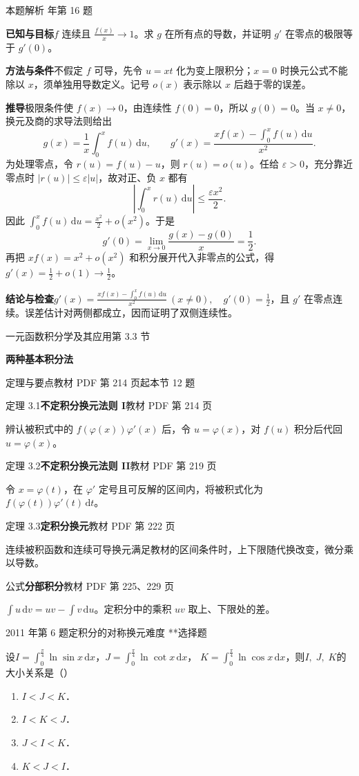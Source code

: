 \documentclass[UTF8,zihao=-4,fontset=fandol]{ctexart}
\renewcommand{\lim}{\operatorname*{lim}\limits}
\newcommand{\SectionHeading}[4]{%
  \clearpage\hypertarget{sec-#1}{}%
  {\small\textcolor{accent}{#2\hfill 第 #1 节}}\par\medskip
  {\LARGE\bfseries #3}\par\smallskip
  {\small\textcolor{muted}{#4}}\par\bigskip}
\newcommand{\Theory}[4]{%
  {\small\textcolor{accent}{#1}\quad\textbf{#3}\hfill\textcolor{muted}{教材 PDF 第 #2 页}}\par
  {\small #4}\par\smallskip}
\newcommand{\pickout}{\hfill（\hspace{1.4em}）}
\newenvironment{abcd}{\begin{enumerate}[label=\textup{(\Alph*)},leftmargin=2.3em,itemsep=1pt,topsep=4pt,parsep=1pt]}{\end{enumerate}}
\newcounter{BankQuestion}
\newcommand{\QuestionPage}[7]{%
  \stepcounter{BankQuestion}%
  \par\noindent\begin{minipage}{\linewidth}
  \raggedright
  {\small\textcolor{black!60}{#3\quad #5\quad 难度 #7}\hfill\textcolor{accent}{#2}}\par\smallskip}
\newcommand{\QuestionEnd}{\end{minipage}\par\medskip}
\newcommand{\QuestionPage}[7]{%
  \clearpage
  \stepcounter{BankQuestion}%
  {\small\textcolor{accent}{#1\hfill #2}}\par\medskip
  {\small\textcolor{black!60}{#3\quad #5\quad 难度 #7\hfill \arabic{BankQuestion} / 234}}\par\vspace{9bp}}
\newcommand{\QuestionEnd}{}
\newenvironment{QuestionSolution}[1]{%
  \clearpage
  {\small\textcolor{black!60}{本题解析\quad #1}}\par\medskip
}{\par\clearpage}
\begin{document}
\begin{QuestionSolution}{2020 年第 16 题}
\textbf{已知与目标}\quad \(f\) 连续且 \(\frac{f(x)}{x}\to1\)。求 \(g\) 在所有点的导数，并证明 \(g'\) 在零点的极限等于 \(g'(0)\)。

\textbf{方法与条件}\quad 不假定 \(f\) 可导，先令 \(u=xt\) 化为变上限积分；\(x=0\) 时换元公式不能除以 \(x\)，须单独用导数定义。记号 \(o(x)\) 表示除以 \(x\) 后趋于零的误差。

\textbf{推导}\quad 极限条件使 \(f(x)\to0\)，由连续性 \(f(0)=0\)，所以 \(g(0)=0\)。当 \(x\ne0\)，换元及商的求导法则给出
\[
g(x)=\frac1x\int_0^x f(u)\,\mathrm{d}u,\qquad
g'(x)=\frac{xf(x)-\int_0^x f(u)\,\mathrm{d}u}{x^2}.
\]
为处理零点，令 \(r(u)=f(u)-u\)，则 \(r(u)=o(u)\)。任给 \(\varepsilon>0\)，充分靠近零点时 \(|r(u)|\le\varepsilon|u|\)，故对正、负 \(x\) 都有
\[
\left|\int_0^xr(u)\,\mathrm{d}u\right|\le\frac{\varepsilon x^2}{2}.
\]
因此 \(\int_0^xf(u)\,\mathrm{d}u=\frac{x^2}{2}+o(x^2)\)。于是
\[
g'(0)=\lim_{x\to0}\frac{g(x)-g(0)}{x}=\frac12 .
\]
再把 \(xf(x)=x^2+o(x^2)\) 和积分展开代入非零点的公式，得 \(g'(x)=\frac{1}{2}+o(1)\to\frac{1}{2}\)。

\textbf{结论与检查}\quad \(\boxed{g'(x)=\frac{xf(x)-\int_0^xf(u)\,\mathrm{d}u}{x^2}\ (x\ne0),\quad g'(0)=\frac{1}{2}}\)，且 \(g'\) 在零点连续。误差估计对两侧都成立，因而证明了双侧连续性。
\end{QuestionSolution}

\SectionHeading{3.3}{一元函数积分学及其应用}{两种基本积分法}{定理与要点\quad 教材 PDF 第 214 页起\hfill 本节 12 题}
\Theory{定理 3.1}{214}{不定积分换元法则 I}{辨认被积式中的 \(f(\varphi(x))\varphi'(x)\) 后，令 \(u=\varphi(x)\)，对 \(f(u)\) 积分后代回 \(u=\varphi(x)\)。}
\Theory{定理 3.2}{219}{不定积分换元法则 II}{令 \(x=\varphi(t)\)，在 \(\varphi'\) 定号且可反解的区间内，将被积式化为 \(f(\varphi(t))\varphi'(t)\,\mathrm{d}t\)。}
\Theory{定理 3.3}{222}{定积分换元}{连续被积函数和连续可导换元满足教材的区间条件时，上下限随代换改变，微分乘以导数。}
\Theory{公式}{225、229}{分部积分}{\(\int u\,\mathrm{d}v=uv-\int v\,\mathrm{d}u\)。定积分中的乘积 \(uv\) 取上、下限处的差。}
\QuestionPage{3.3 两种基本积分法}{选择题}{2011 年第 6 题}{1}{定积分的对称换元}{152 / 234}{**}
设$I = \int_{0}^{\frac{\pi}{4}}\ln\sin x\,\mathrm{d} x$，$J = \int_{0}^{\frac{\pi}{4}}\ln\cot x\,\mathrm{d} x$，
$K = \int_{0}^{\frac{\pi}{4}}\ln\cos x\,\mathrm{d} x$，则$I,\;J,\;K$的大小关系是\pickout{}
\begin{abcd}
\item $I < J < K$．
\item $I < K < J$．
\item $J < I < K$．
\item $K < J < I$．
\end{abcd}
\QuestionEnd
\end{document}

